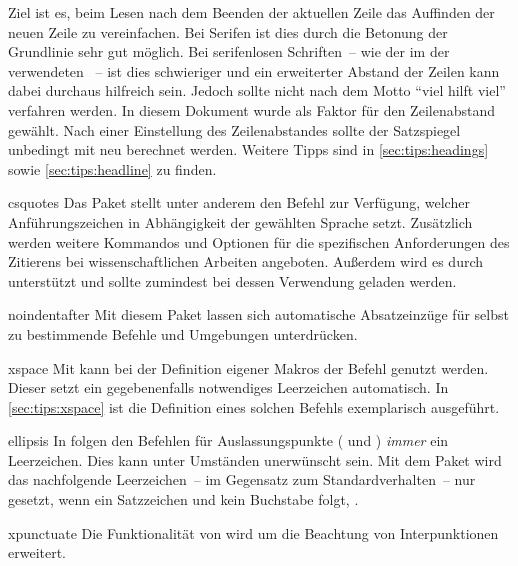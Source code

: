 \begin{packages}
  Ziel ist es, beim Lesen nach dem Beenden der aktuellen Zeile das Auffinden 
  der neuen Zeile zu vereinfachen. Bei Serifen ist dies durch die Betonung der 
  Grundlinie sehr gut möglich. Bei serifenlosen Schriften~-- wie der im \CD der 
  \TnUD verwendeten \Univers~-- ist dies schwieriger und ein erweiterter 
  Abstand der   Zeilen kann dabei durchaus hilfreich sein. Jedoch sollte nicht 
  nach dem Motto \enquote{viel hilft viel} verfahren werden. In diesem Dokument 
  wurde als Faktor für den Zeilenabstand  
  gewählt. Nach einer Einstellung des Zeilenabstandes sollte der Satzspiegel 
  unbedingt mit  neu berechnet werden. Weitere Tipps sind 
  in \autoref{sec:tips:headings} sowie \autoref{sec:tips:headline} zu finden.
\item[csquotes]
  Das Paket stellt unter anderem den Befehl  
  zur Verfügung, welcher Anführungszeichen in Abhängigkeit der gewählten 
  Sprache setzt. Zusätzlich werden weitere Kommandos und Optionen für die 
  spezifischen Anforderungen des Zitierens bei wissenschaftlichen Arbeiten 
  angeboten. Außerdem wird es durch  unterstützt und sollte 
  zumindest bei dessen Verwendung geladen werden.
\item[noindentafter]
  Mit diesem Paket lassen sich automatische Absatzeinzüge für selbst zu 
  bestimmende Befehle und Umgebungen unterdrücken.
\item[xspace]
  Mit  kann bei der Definition eigener Makros der Befehl 
   genutzt werden. Dieser setzt ein gegebenenfalls notwendiges 
  Leerzeichen automatisch. In \autoref{sec:tips:xspace} ist die Definition 
  eines solchen Befehls exemplarisch ausgeführt.
\item[ellipsis]
  In  folgen den Befehlen für Auslassungspunkte ( und 
  ) \emph{immer} ein Leerzeichen. Dies kann unter Umständen 
  unerwünscht sein. Mit dem Paket  wird das nachfolgende 
  Leerzeichen~-- im Gegensatz zum Standardverhalten~-- nur gesetzt, wenn ein 
  Satzzeichen und kein Buchstabe folgt, .
\item[xpunctuate]
  Die Funktionalität von  wird um die Beachtung von 
  Interpunktionen erweitert.

\end{packages}
